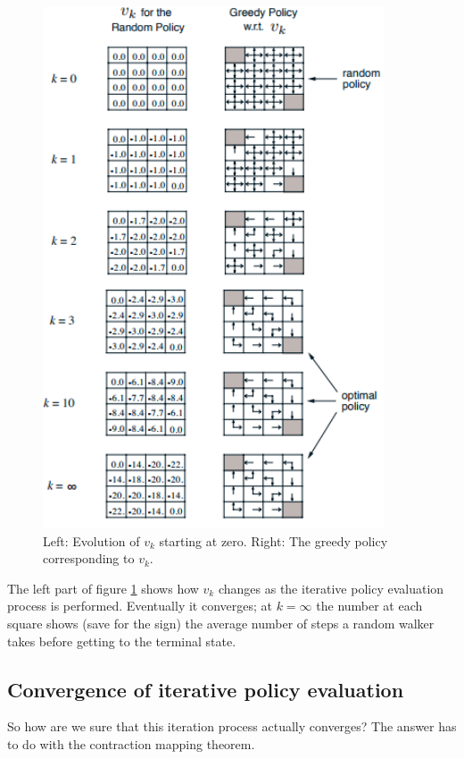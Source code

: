 \documentclass[12pt, a4paper]{article}
\numberwithin{equation}{section}
\begin{document}
\begin{figure}
\centering
\includegraphics[width=0.9\textwidth]{iterative_policy_evaluation}
\caption{Left: Evolution of $v_k$ starting at zero. Right: The greedy policy corresponding to $v_k$.}
\label{fig:iterative_policy_evaluation}
\end{figure}

The left part of figure \ref{fig:iterative_policy_evaluation} shows how $v_k$ changes as the iterative policy evaluation process is performed. Eventually it converges; at $k=\infty$ the number at each square shows (save for the sign) the average number of steps a random walker takes before getting to the terminal state.

\subsection{Convergence of iterative policy evaluation}
So how are we sure that this iteration process actually converges? The answer has to do with the contraction mapping theorem.
\end{document}
